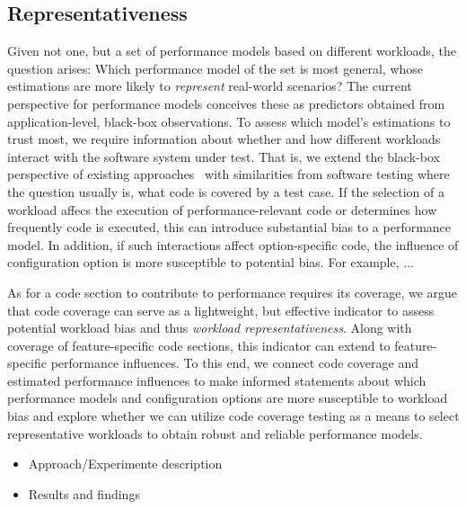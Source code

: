 \subsection*{Representativeness}
Given not one, but a set of performance models based on different workloads, the question arises: Which performance model of the set is most general, whose estimations are more likely to \emph{represent} real-world scenarios? 
{\color{Magenta} The current perspective for performance models conceives these as predictors obtained from application-level, black-box observations.} 
To assess which model's estimations to trust most, we require information about whether and how different workloads interact with the software system under test. 
That is, we extend the black-box perspective of existing approaches~\cite{siegmundPerformanceinfluenceModelsHighly2015,haDeepPerf2019,perfAL,guoVariabilityawarePerformancePrediction2013,sarkarCostEfficientSamplingPerformance,guo_2018_data,fourier_learning_2015,perLasso} {\color{Magenta}with similarities from software testing} where the question usually is, what code is covered by a test case.
If the selection of a workload affecs the execution of performance-relevant code or determines how frequently code is executed, this can introduce substantial bias to a performance model. 
In addition, if such interactions affect option-specific code, the influence of configuration option is more susceptible to potential bias. {\color{Magenta}For example, ...}

As for a code section to contribute to performance requires its coverage, we argue that code coverage can serve as a lightweight, but effective indicator to assess potential workload bias and thus \emph{workload representativeness}. Along with coverage of feature-specific code sections, this indicator can extend to feature-specific performance influences.
To this end, we connect code coverage and estimated performance influences to make informed statements about 
which performance models and configuration options are more susceptible to workload bias and explore whether we can utilize code coverage testing as a means to select representative workloads to obtain robust and reliable performance models.

\begin{itemize}
	\item {\color{Orange} Approach/Experimente description }
	\item {\color{Orange} Results and findings }
\end{itemize}

